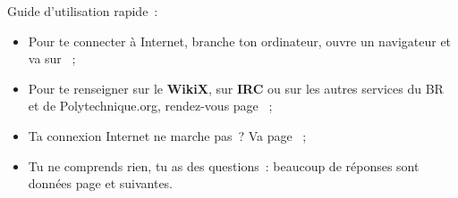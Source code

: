 
Guide d'utilisation rapide~:
\begin{itemize}
\item Pour te connecter à Internet, branche ton ordinateur, ouvre un navigateur et va sur ~;
\item Pour te renseigner sur le \textbf{WikiX}, sur \textbf{IRC} ou sur les autres services du BR et de Polytechnique.org, rendez-vous page \pageref{services}~;
\item Ta connexion Internet ne marche pas~? Va page \pageref{diagnostic}~;
\item Tu ne comprends rien, tu as des questions~: beaucoup de réponses sont données page \pageref{faq} et suivantes.

\end{itemize}

